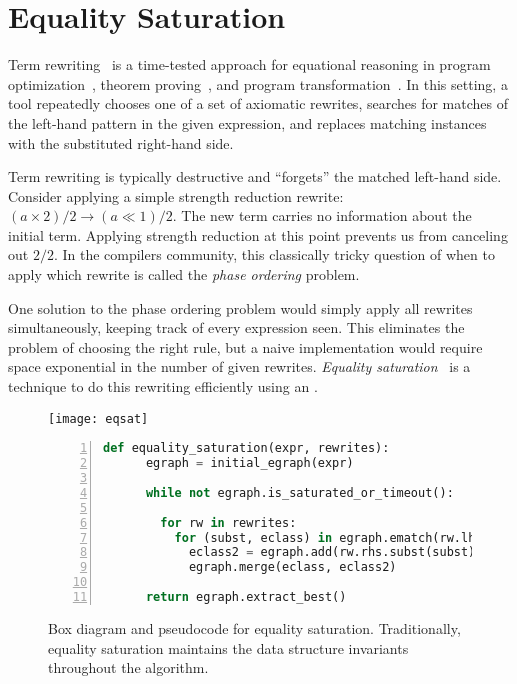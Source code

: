 \section{Equality Saturation}
\label{sec:eqsat}

Term rewriting~\cite{nachum-rewrites} is a time-tested approach
  for equational reasoning in
  program optimization~\cite{eqsat, denali},
  theorem proving~\cite{simplify, z3},
  and program transformation~\cite{graphs}.
In this setting, a tool repeatedly chooses one of a set of axiomatic rewrites,
  searches for matches of the left-hand pattern in the given
  expression, and replaces matching instances with the substituted
  right-hand side.

Term rewriting is typically destructive and ``forgets'' the matched
  left-hand side.
Consider applying a simple strength reduction rewrite:
  ${ (a \times 2) / 2 \to (a \ll 1) / 2 }$.
The new term carries no
  information about the initial term.
Applying strength reduction at this point prevents us from canceling out $2/2$.
In the compilers community, this classically tricky question of when to apply
  which rewrite is called the \textit{phase ordering} problem.

One solution to the phase ordering problem would simply apply all
  rewrites simultaneously, keeping track of every expression seen.
This eliminates the problem of choosing the right rule, but
  a naive implementation would require space exponential in the number
  of given rewrites.
\textit{Equality saturation}~\cite{eqsat, eqsat-llvm} is a technique to do this
  rewriting efficiently using an \egraph.

\begin{figure}
  \begin{minipage}{0.48\linewidth}
    \centering
    \texttt{[image: eqsat]}
  \end{minipage}
  \hfill
  \begin{minipage}{0.46\linewidth}
  \begin{lstlisting}[language=Python, gobble=4, numbers=left, basicstyle=\scriptsize\ttfamily]
    def equality_saturation(expr, rewrites):
      egraph = initial_egraph(expr)

      while not egraph.is_saturated_or_timeout():

        for rw in rewrites:
          for (subst, eclass) in egraph.ematch(rw.lhs):
            eclass2 = egraph.add(rw.rhs.subst(subst))
            egraph.merge(eclass, eclass2)

      return egraph.extract_best()
  \end{lstlisting}
  \end{minipage}
  \caption{
    Box diagram and pseudocode for equality saturation.
    Traditionally, equality saturation maintains the \egraph data structure
      invariants throughout the algorithm.
  }
  \label{fig:eq-sat-bg}
\end{figure}

